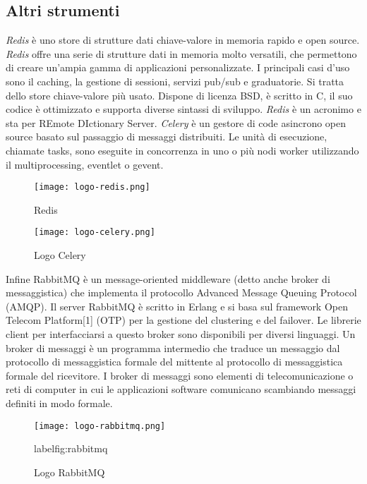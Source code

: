 \subsection{Altri strumenti}

\textit{Redis} è uno store di strutture dati chiave-valore in memoria rapido e open source. \textit{Redis} offre una serie di strutture dati in memoria molto versatili, che permettono di creare un'ampia gamma di applicazioni personalizzate. I principali casi d'uso sono il caching, la gestione di sessioni, servizi pub/sub e graduatorie. Si tratta dello store chiave-valore più usato. Dispone di licenza BSD, è scritto in C, il suo codice è ottimizzato e supporta diverse sintassi di sviluppo. \textit{Redis} è un acronimo e sta per REmote DIctionary Server.
\textit{Celery} è un gestore di code asincrono open source basato sul passaggio di messaggi distribuiti. Le unità di esecuzione, chiamate tasks, sono eseguite in concorrenza in uno o più nodi worker utilizzando il multiprocessing, eventlet o gevent. 


\begin{figure}[!h]
    \begin{minipage}{.5\textwidth} 
        \centering 
        \texttt{[image: logo-redis.png]} 
        \caption{Redis} 
        \label{fig:redis} 
    \end{minipage}%
    \begin{minipage}{.5\textwidth} 
        \centering 
        \texttt{[image: logo-celery.png]} 
        \caption{Logo Celery} 
        \label{fig:celery} 
    \end{minipage}%
\end{figure}

Infine RabbitMQ è un message-oriented middleware (detto anche broker di messaggistica) che implementa il protocollo Advanced Message Queuing Protocol (AMQP). Il server RabbitMQ è scritto in Erlang e si basa sul framework Open Telecom Platform[1] (OTP) per la gestione del clustering e del failover. Le librerie client per interfacciarsi a questo broker sono disponibili per diversi linguaggi.
Un broker di messaggi è un programma intermedio che traduce un messaggio dal protocollo di messaggistica formale del mittente al protocollo di messaggistica formale del ricevitore. I broker di messaggi sono elementi di telecomunicazione o reti di computer in cui le applicazioni software comunicano scambiando messaggi definiti in modo formale. 

\begin{figure}[!h] 
    \centering 
    \texttt{[image: logo-rabbitmq.png]} 
    \caption{Logo RabbitMQ}
    label{fig:rabbitmq} 
\end{figure}

